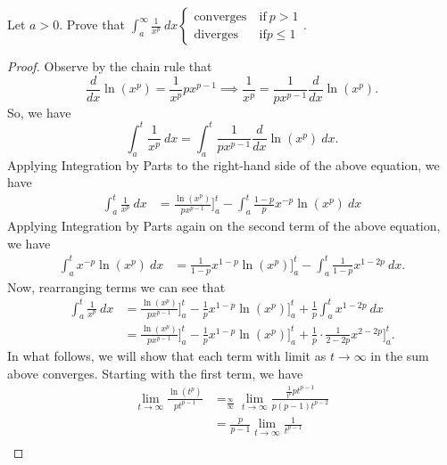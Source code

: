 \documentclass[a4paper]{article}
\begin{document}
\begin{problem}
    Let \( a > 0  \). Prove that \( \displaystyle \int_{ a }^{ \infty  }  \frac{ 1 }{ x^{p} }   \ dx \begin{cases} \text{converges} \ &\text{if}  \ p > 1   \\ \text{diverges} &\text{if} p \leq 1   \end{cases} \). 
\end{problem}
\begin{proof}
    Observe by the chain rule that 
    \[  \frac{ d }{ dx  } \ln (x^{p}) = \frac{ 1 }{ x^{p} }  p x^{p-1} \implies \frac{ 1 }{ x^{p}  } = \frac{ 1 }{ p x^{p-1}  }  \frac{ d }{ dx }  \ln(x^{p}). \]
    So, we have 
    \[  \int_{ a }^{ t } \frac{ 1 }{ x^{p} }   \ dx = \int_{ a }^{ t }  \frac{ 1 }{ p x^{p-1} }  \frac{ d }{ dx }  \ln(x^{p}) \ dx. \]
    Applying Integration by Parts to the right-hand side of the above equation, we have
    \begin{align*}
    \int_{ a }^{ t }  \frac{ 1 }{ x^{p} }  \ dx &= \frac{ \ln (x^{p}) }{ p x^{p-1} } \Big]_{a}^{t} - \int_{ a }^{ t }  \frac{ 1 - p  }{  p  } x^{-p} \ln (x^{p}) \ dx 
    \end{align*}
    Applying Integration by Parts again on the second term of the above equation, we have 
    \begin{align*}
    \int_{ a }^{ t }  x^{-p} \ln (x^{p}) \ dx &= \frac{ 1 }{ 1 - p  }  x^{1-p} \ln (x^{p}) \Big]_{a}^{t} -  \int_{ a }^{ t }  \frac{ 1 }{ 1 - p  } x^{1-2p} \ dx.
    \end{align*}
    Now, rearranging terms we can see that
\begin{align*}  \int_{ a }^{ t } \frac{ 1 }{ x^{p} }    \ dx &= \frac{ \ln (x^{p}) }{ p x^{p-1} }  \Big]_{a}^{t} - \frac{ 1 }{ p }  x^{1-p} \ln(x^{p}) \Big]_{a}^{t} + \frac{ 1 }{ p }  \int_{ a }^{ t }  x^{1-2p} \ dx \\
    &= \frac{ \ln (x^{p}) }{ p x^{p-1} }  \Big]_{a}^{t} - \frac{ 1 }{ p }  x^{1-p} \ln(x^{p}) \Big]_{a}^{t} + \frac{ 1 }{ p } \cdot \frac{ 1  }{ 2 - 2p }  x^{2 - 2p} \Big]_{a}^{t}.
\end{align*}
In what follows, we will show that each term with limit as \( t \to \infty   \) in the sum above converges.
Starting with the first term, we have 
\begin{align*}
    \lim_{ t \to \infty  }  \frac{ \ln(t^{p}) }{ p t^{p-1} } &=_{\frac{ \infty  }{ \infty  } } \lim_{ t \to \infty  }  \frac{ \frac{ 1 }{ t^{p} }  p t^{p-1} }{ p (p-1) t^{p-2} }  \\
                                                             &= \frac{ p }{ p - 1  }  \lim_{ t \to \infty  }  \frac{ 1 }{ t^{p-1} } \\

\end{align*}
\end{proof}
\end{document}
